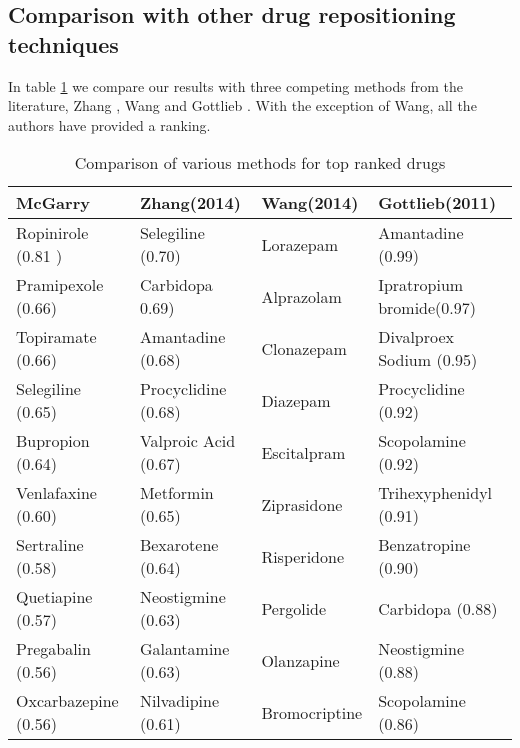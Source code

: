 \documentclass[preprint,11pt]{elsarticle}
\begin{document}
\subsection{Comparison with other drug repositioning techniques}
In table \ref{comparison} we compare our results with three competing methods from the literature, Zhang \cite{Zhang2014}, Wang \cite{Wang2014} and Gottlieb \cite{Gottlieb2011}. With the exception of Wang, all the authors have provided a ranking.

\begin{table}[h]
\centering \caption{Comparison of various methods for top ranked drugs}\label{comparison}
\scriptsize
\begin{tabular}{llll}
  \hline
 McGarry &  Zhang(2014) & Wang(2014) & Gottlieb(2011) \\ 
  \hline
  Ropinirole (0.81 ) & Selegiline (0.70) & Lorazepam & Amantadine (0.99)\\
  Pramipexole (0.66) & Carbidopa 0.69) & Alprazolam& Ipratropium bromide(0.97)\\
  Topiramate  (0.66) & Amantadine (0.68) & Clonazepam& Divalproex Sodium (0.95) \\
  Selegiline (0.65) & Procyclidine (0.68) & Diazepam & Procyclidine (0.92) \\
  Bupropion (0.64) & Valproic Acid (0.67) & Escitalpram & Scopolamine (0.92) \\
  Venlafaxine (0.60) & Metformin (0.65) & Ziprasidone & Trihexyphenidyl (0.91) \\
  Sertraline  (0.58) & Bexarotene (0.64) & Risperidone& Benzatropine (0.90) \\
  Quetiapine (0.57) & Neostigmine (0.63) & Pergolide & Carbidopa (0.88)\\
  Pregabalin (0.56) & Galantamine (0.63) & Olanzapine& Neostigmine (0.88)\\
  Oxcarbazepine (0.56) & Nilvadipine (0.61) & Bromocriptine & Scopolamine (0.86) \\
   \hline
\end{tabular}
\end{table}
\normalsize
\end{document}
